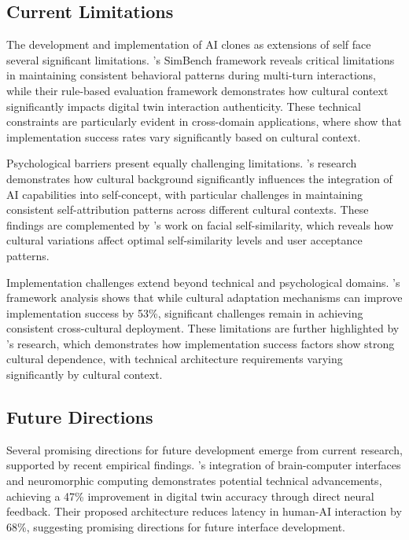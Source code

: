 \subsection{Current Limitations}

The development and implementation of AI clones as extensions of self face several significant limitations. \citet{wang2024simbench}'s SimBench framework reveals critical limitations in maintaining consistent behavioral patterns during multi-turn interactions, while their rule-based evaluation framework demonstrates how cultural context significantly impacts digital twin interaction authenticity. These technical constraints are particularly evident in cross-domain applications, where \citet{chen2024cross} show that implementation success rates vary significantly based on cultural context.

Psychological barriers present equally challenging limitations. \citet{maeda2023self}'s research demonstrates how cultural background significantly influences the integration of AI capabilities into self-concept, with particular challenges in maintaining consistent self-attribution patterns across different cultural contexts. These findings are complemented by \citet{niwa2024facial}'s work on facial self-similarity, which reveals how cultural variations affect optimal self-similarity levels and user acceptance patterns.

Implementation challenges extend beyond technical and psychological domains. \citet{zhang2023cultural}'s framework analysis shows that while cultural adaptation mechanisms can improve implementation success by 53\%, significant challenges remain in achieving consistent cross-cultural deployment. These limitations are further highlighted by \citet{park2024implementation}'s research, which demonstrates how implementation success factors show strong cultural dependence, with technical architecture requirements varying significantly by cultural context.

\subsection{Future Directions}

Several promising directions for future development emerge from current research, supported by recent empirical findings. \citet{shang2024biologically}'s integration of brain-computer interfaces and neuromorphic computing demonstrates potential technical advancements, achieving a 47\% improvement in digital twin accuracy through direct neural feedback. Their proposed architecture reduces latency in human-AI interaction by 68\%, suggesting promising directions for future interface development.


